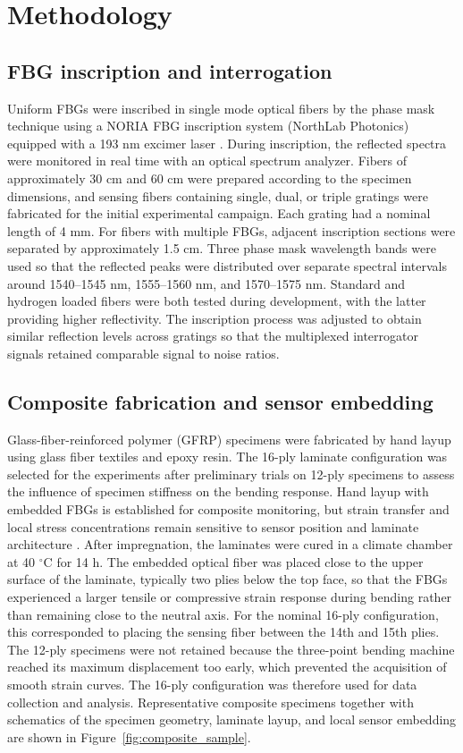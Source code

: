 \documentclass[fleqn,10pt]{wlscirep}
\begin{document}
\section*{Methodology}

\subsection*{FBG inscription and interrogation}

Uniform FBGs were inscribed in single mode optical fibers by the phase mask technique using a NORIA FBG inscription system (NorthLab Photonics) equipped with a 193 nm excimer laser \cite{nieuwland2016}. During inscription, the reflected spectra were monitored in real time with an optical spectrum analyzer. Fibers of approximately 30 cm and 60 cm were prepared according to the specimen dimensions, and sensing fibers containing single, dual, or triple gratings were fabricated for the initial experimental campaign. Each grating had a nominal length of 4 mm. For fibers with multiple FBGs, adjacent inscription sections were separated by approximately 1.5 cm. Three phase mask wavelength bands were used so that the reflected peaks were distributed over separate spectral intervals around 1540--1545 nm, 1555--1560 nm, and 1570--1575 nm. Standard and hydrogen loaded fibers were both tested during development, with the latter providing higher reflectivity. The inscription process was adjusted to obtain similar reflection levels across gratings so that the multiplexed interrogator signals retained comparable signal to noise ratios.

\subsection*{Composite fabrication and sensor embedding}

Glass-fiber-reinforced polymer (GFRP) specimens were fabricated by hand layup using glass fiber textiles and epoxy resin. The 16-ply laminate configuration was selected for the experiments after preliminary trials on 12-ply specimens to assess the influence of specimen stiffness on the bending response. Hand layup with embedded FBGs is established for composite monitoring, but strain transfer and local stress concentrations remain sensitive to sensor position and laminate architecture \cite{kuang2001,luyckx2011,kinet2014}. After impregnation, the laminates were cured in a climate chamber at 40 $^\circ$C for 14 h. The embedded optical fiber was placed close to the upper surface of the laminate, typically two plies below the top face, so that the FBGs experienced a larger tensile or compressive strain response during bending rather than remaining close to the neutral axis. For the nominal 16-ply configuration, this corresponded to placing the sensing fiber between the 14th and 15th plies. The 12-ply specimens were not retained because the three-point bending machine reached its maximum displacement too early, which prevented the acquisition of smooth strain curves. The 16-ply configuration was therefore used for data collection and analysis. Representative composite specimens together with schematics of the specimen geometry, laminate layup, and local sensor embedding are shown in Figure~\ref{fig:composite_sample}.
\end{document}

